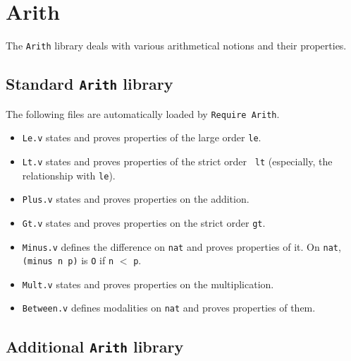 \section{Arith}\label{Arith}

The {\tt Arith} library deals with various arithmetical notions and 
their properties.

\subsection*{Standard {\tt Arith} library}

The following files are automatically loaded by {\tt Require Arith}.

\begin{itemize}

\item {\tt Le.v} states and proves properties of the large order {\tt le}.

\item {\tt Lt.v} states and proves properties of the strict order {\tt 
lt} (especially, the relationship with {\tt le}).

\item {\tt Plus.v} states and proves properties on the addition.

\item {\tt Gt.v} states and proves properties on the strict order {\tt gt}.

\item {\tt Minus.v} defines the difference on 
{\tt nat} and proves properties of it. On {\tt nat}, {\tt (minus n p)} is 
{\tt O} if {\tt n} $<$ {\tt p}.

\item {\tt Mult.v} states and proves properties on the multiplication.

\item {\tt Between.v} defines modalities on {\tt nat} and proves properties 
of them.

\end{itemize}

\subsection*{Additional {\tt Arith} library}

